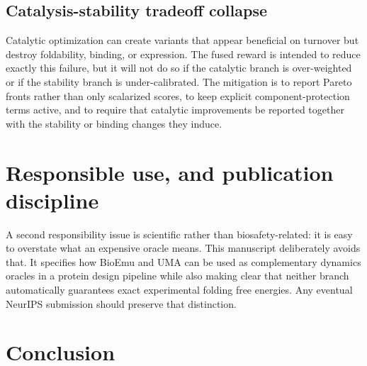 \documentclass[11pt]{article}
\begin{document}
	\subsection{Catalysis-stability tradeoff collapse}
	
	Catalytic optimization can create variants that appear beneficial on turnover but destroy foldability, binding, or expression. The fused reward is intended to reduce exactly this failure, but it will not do so if the catalytic branch is over-weighted or if the stability branch is under-calibrated. The mitigation is to report Pareto fronts rather than only scalarized scores, to keep explicit component-protection terms active, and to require that catalytic improvements be reported together with the stability or binding changes they induce.
	
	\section{Responsible use, and publication discipline}
	
	A second responsibility issue is scientific rather than biosafety-related: it is easy to overstate what an expensive oracle means. This manuscript deliberately avoids that. It specifies how BioEmu and UMA can be used as complementary dynamics oracles in a protein design pipeline while also making clear that neither branch automatically guarantees exact experimental folding free energies. Any eventual NeurIPS submission should preserve that distinction.
	
	\section{Conclusion}
	
\end{document}
